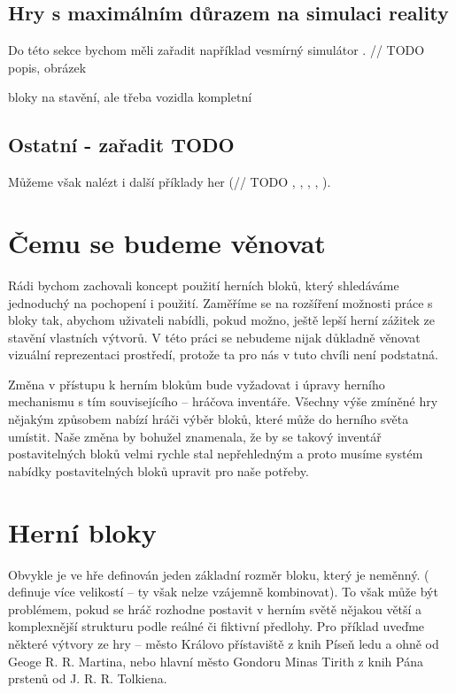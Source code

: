 \FloatBarrier


\subsection{Hry s maximálním důrazem na simulaci reality}

Do této sekce bychom měli zařadit například vesmírný simulátor \TM{}. // TODO popis, obrázek

bloky na stavění, ale třeba vozidla kompletní

\subsection{Ostatní - zařadit TODO }

Můžeme však nalézt i další příklady her (// TODO \TM{}, \NI{}, \PN{}, \ARK{}, \NMS{}).



\section{Čemu se budeme věnovat}

Rádi bychom zachovali koncept použití herních bloků, který shledáváme jednoduchý na pochopení i použití. Zaměříme se na rozšíření možnosti práce s bloky tak, abychom uživateli nabídli, pokud možno, ještě lepší herní zážitek ze stavění vlastních výtvorů. V této práci se nebudeme nijak důkladně věnovat vizuální reprezentaci prostředí, protože ta pro nás v tuto chvíli není podstatná. 

Změna v přístupu k herním blokům bude vyžadovat i úpravy herního mechanismu s tím souvisejícího -- hráčova inventáře. Všechny výše zmíněné hry nějakým způsobem nabízí hráči výběr bloků, které může do herního světa umístit. Naše změna by bohužel znamenala, že by se takový inventář postavitelných bloků velmi rychle stal nepřehledným a proto musíme systém nabídky postavitelných bloků upravit pro naše potřeby.

\section{Herní bloky}



Obvykle je ve hře definován jeden základní rozměr bloku, který je neměnný. (\SE{} definuje více velikostí -- ty však nelze vzájemně kombinovat). To však může být problémem, pokud se hráč rozhodne postavit v herním světě nějakou větší a komplexnější strukturu podle reálné či fiktivní předlohy. Pro příklad uveďme některé výtvory ze hry \MC{} -- město Královo přístaviště z knih Píseň ledu a ohně od Geoge R. R. Martina, nebo hlavní město Gondoru Minas Tirith z knih Pána prstenů od J. R. R. Tolkiena.


